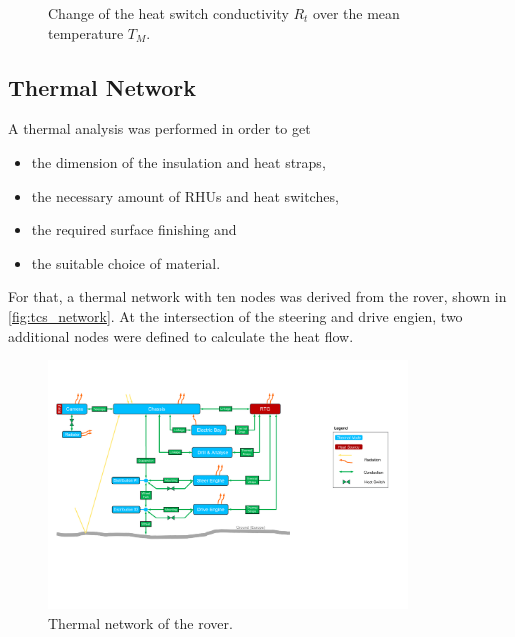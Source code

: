 \begin{figure}[h]
	\centering
	\qquad
	\caption{Change of the heat switch conductivity $R_t$ over the mean temperature $T_M$.}
	\label{fig:tcs_switch02}
\end{figure}

\subsection{Thermal Network}
A thermal analysis was performed in order to get
\begin{itemize}
	\item the dimension of the insulation and heat straps,
	\item the necessary amount of RHUs and heat switches,
	\item the required surface finishing and
	\item the suitable choice of material.\\
\end{itemize}

For that, a thermal network with ten nodes was derived from the rover, shown in \autoref{fig:tcs_network}.
At the intersection of the steering and drive engien, two additional nodes were defined to calculate the heat flow.

\begin{figure}[H]
	\centering
	\includegraphics[width=0.85\textwidth]{Media/tcs_network}
	\caption{Thermal network of the rover.}
	\label{fig:tcs_network}
\end{figure}

